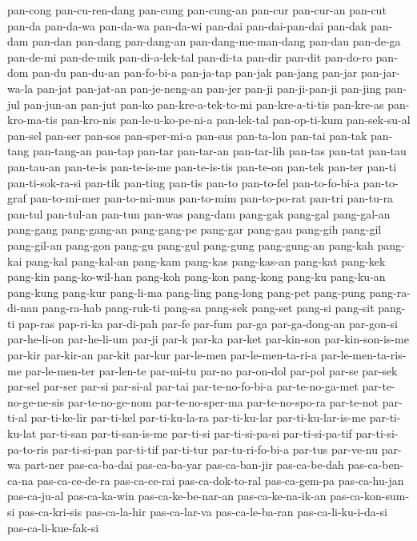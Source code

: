 {pan-cong pan-cu-ren-dang pan-cung pan-cung-an pan-cur pan-cur-an pan-cut
pan-da pan-da-wa pan-da-wa pan-da-wi pan-dai pan-dai-pan-dai pan-dak
pan-dam pan-dan pan-dang pan-dang-an pan-dang-me-man-dang pan-dau
pan-de-ga pan-de-mi pan-de-mik pan-di-a-lek-tal pan-di-ta pan-dir pan-dit
pan-do-ro pan-dom pan-du pan-du-an pan-fo-bi-a pan-ja-tap pan-jak pan-jang
pan-jar pan-jar-wa-la pan-jat pan-jat-an pan-je-neng-an pan-jer pan-ji
pan-ji-pan-ji pan-jing pan-jul pan-jun-an pan-jut pan-ko
pan-kre-a-tek-to-mi pan-kre-a-ti-tis pan-kre-as pan-kro-ma-tis pan-kro-nis
pan-le-u-ko-pe-ni-a pan-lek-tal pan-op-ti-kum pan-sek-su-al pan-sel
pan-ser pan-sos pan-sper-mi-a pan-sus pan-ta-lon pan-tai pan-tak pan-tang
pan-tang-an pan-tap pan-tar pan-tar-an pan-tar-lih pan-tas pan-tat pan-tau
pan-tau-an pan-te-is pan-te-is-me pan-te-is-tis pan-te-on pan-tek pan-ter
pan-ti pan-ti-sok-ra-si pan-tik pan-ting pan-tis pan-to pan-to-fel
pan-to-fo-bi-a pan-to-graf pan-to-mi-mer pan-to-mi-mus pan-to-mim
pan-to-po-rat pan-tri pan-tu-ra pan-tul pan-tul-an pan-tun pan-was
pang-dam pang-gak pang-gal pang-gal-an pang-gang pang-gang-an pang-gang-pe
pang-gar pang-gau pang-gih pang-gil pang-gil-an pang-gon pang-gu pang-gul
pang-gung pang-gung-an pang-kah pang-kai pang-kal pang-kal-an pang-kam
pang-kas pang-kas-an pang-kat pang-kek pang-kin pang-ko-wil-han pang-koh
pang-kon pang-kong pang-ku pang-ku-an pang-kung pang-kur pang-li-ma
pang-ling pang-long pang-pet pang-pung pang-ra-di-nan pang-ra-hab
pang-ruk-ti pang-sa pang-sek pang-set pang-si pang-sit pang-ti pap-ras
pap-ri-ka par-di-pah par-fe par-fum par-ga par-ga-dong-an par-gon-si
par-he-li-on par-he-li-um par-ji par-k par-ka par-ket par-kin-son
par-kin-son-is-me par-kir par-kir-an par-kit par-kur par-le-men
par-le-men-ta-ri-a par-le-men-ta-ris-me par-le-men-ter par-len-te
par-mi-tu par-no par-on-dol par-pol par-se par-sek par-sel par-ser par-si
par-si-al par-tai par-te-no-fo-bi-a par-te-no-ga-met par-te-no-ge-ne-sis
par-te-no-ge-nom par-te-no-sper-ma par-te-no-spo-ra par-te-not par-ti-al
par-ti-ke-lir par-ti-kel par-ti-ku-la-ra par-ti-ku-lar par-ti-ku-lar-is-me
par-ti-ku-lat par-ti-san par-ti-san-is-me par-ti-si par-ti-si-pa-si
par-ti-si-pa-tif par-ti-si-pa-to-ris par-ti-si-pan par-ti-tif par-ti-tur
par-tu-ri-fo-bi-a par-tus par-ve-nu par-wa part-ner pas-ca-ba-dai
pas-ca-ba-yar pas-ca-ban-jir pas-ca-be-dah pas-ca-ben-ca-na
pas-ca-ce-de-ra pas-ca-ce-rai pas-ca-dok-to-ral pas-ca-gem-pa
pas-ca-hu-jan pas-ca-ju-al pas-ca-ka-win pas-ca-ke-be-nar-an
pas-ca-ke-na-ik-an pas-ca-kon-sum-si pas-ca-kri-sis pas-ca-la-hir
pas-ca-lar-va pas-ca-le-ba-ran pas-ca-li-ku-i-da-si pas-ca-li-kue-fak-si
}
